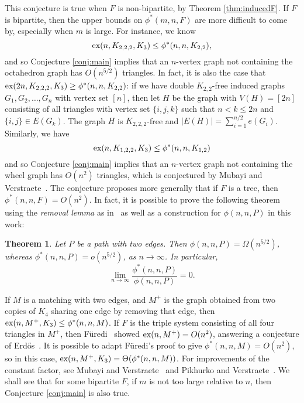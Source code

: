 \documentclass[12pt]{article}
\newtheorem{theorem}{Theorem}
\newcommand*{\ex}{\textnormal{ex}}
\begin{document}
This conjecture is true when $F$ is non-bipartite, by Theorem \ref{thm:inducedF}. If $F$ is bipartite, then the upper bounds on $\phi^*(m, n, F)$ are more difficult to come by, especially when $m$ is large. For instance, we know 
\[ 
  \ex(n, K_{2,2,2}, K_3) \leq \phi^*(n, n, K_{2,2}),
\]
and so Conjecture \ref{conj:main} implies that an $n$-vertex graph not containing the octahedron graph has $O(n^{5/2})$ triangles. In fact, it is also the case that $\ex(2n, K_{2,2,2}, K_3) \geq \phi^*(n, n, K_{2,2})$: if we have double $K_{2,2}$-free induced graphs $G_1, G_2, \dots, G_{n}$ with vertex set $[n]$, then let $H$ be the graph with $V(H) = [2n]$ consisting of all triangles with vertex set $\{i, j, k\}$ such that $n < k \leq 2n$ and $\{i, j\} \in E(G_k)$. The graph $H$ is $K_{2, 2, 2}$-free and $|E(H)| = \sum_{i = 1}^{n/2} e(G_i)$. Similarly, we have
\[ 
  \ex(n, K_{1, 2, 2}, K_3) \leq \phi^*(n, n, K_{1,2})
\]
and so Conjecture \ref{conj:main} implies that an $n$-vertex graph not containing the wheel graph has $O(n^{2})$ triangles, which is conjectured by Mubayi and Verstraete~\cite{MubayiV2016}. The conjecture proposes more generally that if $F$ is a tree, then $\phi^*(n, n, F) = O(n^2)$. In fact, it is possible to prove the following theorem using the \textit{removal lemma} as in~\cite{MubayiMukherjee2023} as well as a construction for $\phi(n, n, P)$ in this work:

\begin{theorem}\label{thm:inducedP}
Let $P$ be a path with two edges. Then $\phi(n, n, P) = \Omega(n^{5/2})$, whereas $\phi^*(n, n, P) = o(n^{5/2})$, as $n \rightarrow \infty$. In particular, 
\[ 
  \lim_{n \rightarrow \infty} \frac{\phi^*(n, n, P)}{\phi(n, n, P)} = 0.
\]
\end{theorem}

If $M$ is a matching with two edges, and $M^+$ is the graph obtained from two copies of $K_4$ sharing one edge by removing that edge, then $\ex(n, M^+, K_3) \leq \phi^*(n, n, M)$. If $F$ is the triple system consisting of all four triangles in $M^+$, then F\"{u}redi~\cite{Furedi1984} showed $\ex(n, M^+) = O(n^2)$, answering a conjecture of Erd\H{o}s~\cite{Erdos1977}. It is possible to adapt F\"{u}redi's proof to give $\phi^*(n, n, M) = O(n^2)$, so in this case, $\ex(n, M^+, K_3) = \Theta(\phi^*(n, n, M))$. For improvements of the constant factor, see Mubayi and Verstraete~\cite{MubayiV2004} and Pikhurko and Verstraete~\cite{PikhurkoV2009}. We shall see that for some bipartite $F$, if $m$ is not too large relative to $n$, then Conjecture \ref{conj:main} is also true. 
\end{document}
